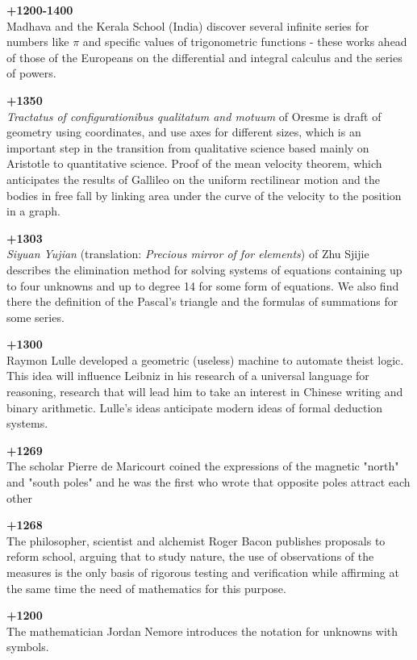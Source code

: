 \textbf{+1200-1400}\\
Madhava and the Kerala School (India) discover several infinite series for numbers like $\pi$ and specific values of trigonometric functions - these works ahead of those of the Europeans on the differential and integral calculus and the series of powers.

\textbf{+1350}\\
\textit{Tractatus of configurationibus qualitatum and motuum} of Oresme is draft of geometry using coordinates, and use axes for different sizes, which is an important step in the transition from qualitative science based mainly on Aristotle to quantitative science. Proof of the mean velocity theorem, which anticipates the results of Gallileo on the uniform rectilinear motion and the bodies in free fall by linking area under the curve of the velocity to the position in a graph.

\textbf{+1303}\\
\textit{Siyuan Yujian }(translation:\textit{ Precious mirror of for elements}) of Zhu Sjijie describes the elimination method for solving systems of equations containing up to four unknowns and up to degree 14 for some form of equations. We also find there the definition of the Pascal's triangle and the formulas of summations for some series.

\textbf{+1300}\\
Raymon Lulle developed a geometric (useless) machine to automate theist logic. This idea will influence Leibniz in his research of a universal language for reasoning, research that will lead him to take an interest in Chinese writing and binary arithmetic. Lulle's ideas anticipate modern ideas of formal deduction systems.

\textbf{+1269}\\
The scholar Pierre de Maricourt coined the expressions of the magnetic "north" and "south poles" and he was the first who wrote that opposite poles attract each other

\textbf{+1268}\\
The philosopher, scientist and alchemist Roger Bacon publishes proposals to reform school, arguing that to study nature, the use of observations of the measures is the only basis of rigorous testing and verification while affirming at the same time the need of mathematics for this purpose.

\textbf{+1200}\\
The mathematician Jordan Nemore introduces the notation for unknowns with symbols.

